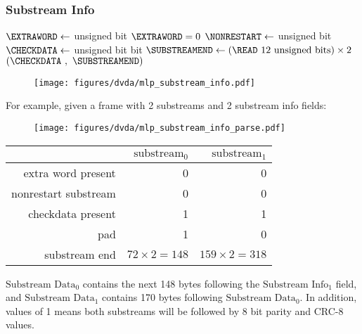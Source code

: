 \subsubsection{Substream Info}
\label{mlp:read_substream_info}
{
$\text{\EXTRAWORD} \leftarrow$  unsigned bit\;
\ASSERT $\text{\EXTRAWORD} = 0$\;
$\text{\NONRESTART} \leftarrow$  unsigned bit\;
$\text{\CHECKDATA} \leftarrow$  unsigned bit\;
 bit\;
$\text{\SUBSTREAMEND} \leftarrow (\text{\READ 12 unsigned bits}) \times 2$\;
\Return $(\text{\CHECKDATA}~,~\text{\SUBSTREAMEND})$\;
\EALGORITHM
}
\begin{figure}[h]
  \texttt{[image: figures/dvda/mlp\_substream\_info.pdf]}
\end{figure}
\par
\noindent
For example, given a frame with 2 substreams
and 2 substream info fields:
\begin{figure}[h]
  \texttt{[image: figures/dvda/mlp\_substream\_info\_parse.pdf]}
\end{figure}
\begin{table}[h]
\begin{tabular}{rrr}
& $\text{substream}_0$ & $\text{substream}_1$ \\
\hline
extra word present & 0 & 0 \\
nonrestart substream & 0 & 0 \\
checkdata present & 1 & 1 \\
pad & 1 & 0 \\
substream end & $72 \times 2 = 148$ & $159 \times 2 = 318$ \\
\end{tabular}
\end{table}
\par
\noindent
$\text{Substream Data}_0$ contains
the next 148 bytes following the $\text{Substream Info}_1$ field,
and $\text{Substream Data}_1$ contains 170 bytes
following $\text{Substream Data}_0$.
In addition,  values of 1
means both substreams will be followed by 8 bit parity and CRC-8 values.

\clearpage

